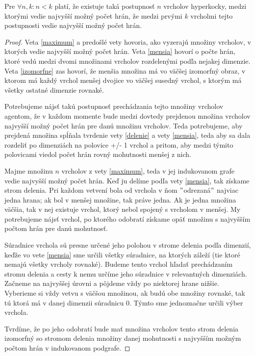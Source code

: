\begin{lem}
Pre $\forall n, k: n < k$ platí, že existuje taká postupnosť $n$
vrcholov hyperkocky, medzi ktorými vedie najvyšší možný počet hrán, 
že medzi prvými $k$
vrcholmi tejto postupnosti vedie najvyšší možný počet hrán.
\end{lem}

\begin{proof}
Veta \ref{maximum} a predošlé vety hovoria, ako vyzerajú množiny vrcholov,
v ktorých vedie najvyšší možný počet hrán. Veta \ref{mensia} hovorí o počte
hrán, ktoré vedú medzi dvomi množinami vrcholov rozdelenými podľa nejakej
dimenzie. Veta \ref{izomorfne} zas hovorí, že menšia množina má vo väčšej
izomorfný obraz, v ktorom má každý vrchol menšej dvojice vo väčšej susedný 
vrchol, s ktorým má všetky ostatné dimenzie rovnaké.

Potrebujeme nájsť takú postupnosť prechádzania tejto množiny vrcholov
agentom, že
v každom momente bude medzi dovtedy prejdenou množina vrcholov najvyšší
možný počet hrán pre danú množinu vrcholov.
Teda potrebujeme, aby prejdená množina spĺňala tvrdenie vety \ref{delenie}
 a vety
\ref{mensia}, teda aby sa dala rozdeliť po dimenziách na polovice +/- 1
vrchol a pritom, aby medzi týmito polovicami viedol počet hrán rovný
mohutnosti menšej z nich.

Majme množinu $n$ vrcholov z vety \ref{maximum}, teda v jej
indukovanom grafe vedie najvyšší možný počet hrán. Keď ju delíme podľa vety
\ref{mensia}, tak získame strom delenia.
Pri každom vetvení bola od vrchola
v ňom $"$odrezaná$"$ najviac jedna hrana; ak bol v menšej množine, tak práve
jedna. Ak je jedna množina väčšia, tak v nej existuje vrchol, ktorý nebol
spojený s vrcholom v menšej. My potrebujeme nájsť vrchol, po ktorého
odobratí získame opäť množinu s najvyšším počtom hrán pre danú mohutnosť.

Súradnice vrchola sú
presne určené jeho polohou v strome delenia podľa dimenzií, keďže vo vete
\ref{mensia} sme určili všetky súradnice, na ktorých záleží (tie ktoré
nemajú všetky vrcholy rovnaké). Budeme
tento vrchol hľadať prechádzaním stromu delenia a cesty k nemu určíme
jeho súradnice v relevantných dimenziách. 
Začneme na najvyššej úrovni a
pôjdeme vždy po niektorej hrane nižšie. Vyberieme si vždy vetvu s väčšou
množinou, ak budú obe množiny rovnaké, tak tú ktorá má v danej dimenzii
súradnicu 0. Týmto sme jednoznačne určili výber vrchola. 

Tvrdíme, že po jeho
odobratí bude mať množina vrcholov tento strom delenia izomorfný so stromom
delenia množiny danej mohutnosti s najvyšším možným počtom hrán v
indukovanom podgrafe. 


\end{proof}
